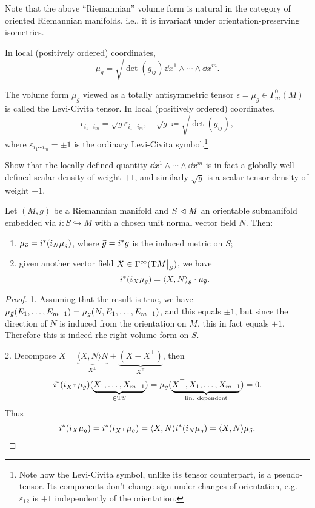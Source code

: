 Note that the above ``Riemannian'' volume form is natural in the category of oriented Riemannian manifolds, i.e., it is invariant under orientation-preserving isometries.

In local (positively ordered) coordinates, \[\mu_g=\sqrt{\det(g_{ij})}\dd x^1\wedge\cdots\wedge \dd x^m.\]

\begin{defn}
    The volume form $\mu_g$ viewed as a totally antisymmetric tensor $\epsilon=\mu_g\in\Gamma^0_m(M)$ is called the Levi-Civita tensor. In local (positively ordered) coordinates,
    \[\epsilon_{i_1\cdots i_m}=\sqrt g\varepsilon_{i_1\cdots i_m},\quad \sqrt g\coloneqq\sqrt{\det(g_{ij})},\]
    where $\varepsilon_{i_1\cdots i_m}=\pm 1$ is the ordinary Levi-Civita symbol.\footnote{Note how the Levi-Civita symbol, unlike its tensor counterpart, is a pseudo-tensor. Its components don't change sign under changes of orientation, e.g. $\varepsilon_{12}$ is $+1$ independently of the orientation.}
\end{defn}

\begin{xca}
    Show that the locally defined quantity $\dd x^1\wedge\cdots \wedge\dd x^m$ is in fact a globally well-defined scalar density of weight $+1$, and similarly  $\sqrt{g}$ is a scalar tensor density of weight $-1$.
\end{xca}

\begin{prop}
    Let $(M,g)$ be a Riemannian manifold and $S\vartriangleleft M$ an orientable submanifold embedded via $i:S\hookrightarrow M$ with a chosen unit normal vector field $N$. Then:
    \begin{enumerate}
        \item $\mu_{\wt{g}}=i^\ast (i_N \mu_g)$, where $\wt{g}=i^\ast g$ is the induced metric on $S$;
        \item given another vector field $X\in\Gamma^\infty(\restr{\T M}{S})$, we have 
        \[i^\ast(i_X\mu_g)=\langle X,N\rangle_g \cdot \mu_{\wt{g}}.\]
    \end{enumerate}
\end{prop}
\begin{proof}
        1. Assuming that the result is true, we have $\mu_{\wt{g}}(E_1,\ldots,E_{m-1})=\mu_g(N,E_1,\ldots,E_{m-1})$, and this equals $\pm 1$, but since the direction of $N$ is induced from the orientation on $M$, this in fact equals $+1$. Therefore this is indeed rhe right volume form on $S$.
        
        2. Decompose $X=\underbrace{\langle X,N\rangle N}_{X^\perp}+\underbrace{(X-X^\perp)}_{X^\top}$,
        then 
        \[i^\ast(i_{X^\top}\mu_g)(\underbrace{X_1,\ldots,X_{m-1}}_{\in \mathrm{T} S})=\mu_g(\underbrace{X^\top,X_1,\ldots,X_{m-1}}_{\text{lin. dependent}})=0.\]
        Thus 
        \[i^\ast(i_X\mu_g)=i^\ast(i_{X^\top}\mu_g)=\langle X,N \rangle i^\ast (i_N \mu_g)=\langle X,N\rangle \mu_{\wt{g}}.\]
\end{proof}

